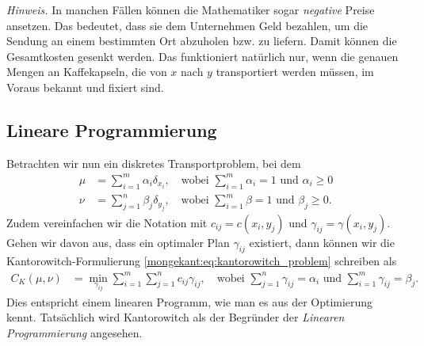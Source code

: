 \emph{Hinweis.}
In manchen Fällen können die Mathematiker sogar \emph{negative} Preise ansetzen.
Das bedeutet,
dass sie dem Unternehmen Geld bezahlen,
um die Sendung an einem bestimmten Ort abzuholen bzw. zu liefern.
Damit können die Gesamtkosten gesenkt werden.
Das funktioniert natürlich nur,
wenn die genauen Mengen an Kaffekapseln,
die von $x$ nach $y$ transportiert werden müssen,
im Voraus bekannt und fixiert sind.

\subsection{Lineare Programmierung%
\label{mongekant:subsection:linear_programming}}

Betrachten wir nun ein diskretes Transportproblem,
bei dem
\begin{align*}
\mu
&=
\sum_{i=1}^m \alpha_i \delta_{x_i}
,\quad\text{wobei }
\sum_{i=1}^m \alpha_i = 1
\text{ und }
\alpha_i \geq 0
\\
\nu
&=
\sum_{j=1}^n \beta_j \delta_{y_j}
,\quad\text{wobei }
\sum_{i=1}^m \beta = 1
\text{ und }
\beta_j \geq 0
.
\end{align*}
Zudem vereinfachen wir die Notation mit $c_{ij} = c(x_i, y_j)$ und
$\gamma_{ij} = \gamma(x_i, y_j)$.
Gehen wir davon aus,
dass ein optimaler Plan $\gamma_{ij}$ existiert,
dann können wir die Kantorowitch-Formulierung \eqref{mongekant:eq:kantorowitch_problem} schreiben als
\begin{align*}
C_K(\mu, \nu)
&=
\min_{\gamma_{ij}}
\sum_{i=1}^m \sum_{j=1}^n c_{ij} \gamma_{ij}
,\quad
\text{wobei }
\sum_{j=1}^n \gamma_{ij} = \alpha_i
\text{ und }
\sum_{i=1}^m \gamma_{ij} = \beta_j
.
\end{align*}
Dies entspricht einem linearen Programm,
wie man es aus der Optimierung kennt.
Tatsächlich wird Kantorowitch als der Begründer der \emph{Linearen Programmierung} angesehen.

